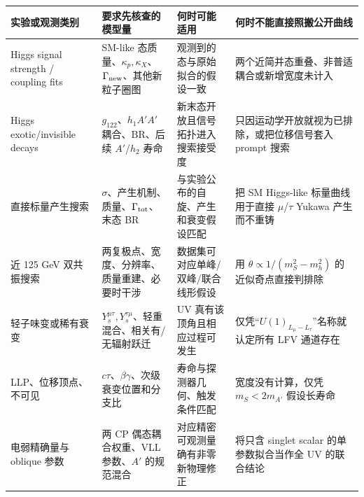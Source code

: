 \documentclass[
  chinese,
  UTF8]{ctexart}
\newcounter{none} %
\begin{document}
{\def\LTcaptype{none} %
\begin{longtable}[]{@{}
  >{\raggedright\arraybackslash}p{}
  >{\raggedright\arraybackslash}p{}
  >{\raggedright\arraybackslash}p{}
  >{\raggedright\arraybackslash}p{}@{}}
\toprule\noalign{}
\begin{minipage}[b]{\linewidth}\raggedright
实验或观测类别
\end{minipage} & \begin{minipage}[b]{\linewidth}\raggedright
要求先核查的模型量
\end{minipage} & \begin{minipage}[b]{\linewidth}\raggedright
何时可能适用
\end{minipage} & \begin{minipage}[b]{\linewidth}\raggedright
何时不能直接照搬公开曲线
\end{minipage} \\
\midrule\noalign{}
\endhead
\bottomrule\noalign{}
\endlastfoot
Higgs signal strength / coupling fits & SM-like
态质量、\(\kappa_p,\kappa_X\)、\(\Gamma_{\rm new}\)、其他新粒子圈图 &
观测到的态与原始拟合的假设一致 &
两个近简并态重叠、非普适耦合或新增宽度未计入 \\
Higgs exotic/invisible decays & \(g_{122}\)、\(h_1A'A'\)
耦合、\(\mathrm{BR}\)、后续 \(A'\)/\(h_2\) 寿命 &
新末态开放且信号拓扑进入搜索接受度 &
只因运动学开放就视为已排除，或把位移信号套入 prompt 搜索 \\
直接标量产生搜索 &
\(\sigma\)、产生机制、质量、\(\Gamma_{\rm tot}\)、末态 BR &
与实验公布的自旋、产生和衰变假设匹配 & 把 SM Higgs-like 标量曲线用于直接
\ensuremath{\mu}/\ensuremath{\tau} Yukawa 产生而不重铸 \\
近 125 GeV 双共振搜索 & 两复极点、宽度、分辨率、质量重建、必要时干涉 &
数据集可对应单峰/双峰/联合线形假设 & 用 \(\theta\propto1/(m_S^2-m_h^2)\)
的近似奇点直接判排除 \\
轻子味变或稀有衰变 &
\(Y_s^{\mu\tau},Y_s^{\tau\mu}\)、轻重混合、相关有/无辐射跃迁 & UV
真有该顶角且相应过程可发生 &
仅凭``\(U(1)_{L_\mu-L_\tau}\)''名称就认定所有 LFV 通道存在 \\
LLP、位移顶点、不可见 & \(c\tau\)、\(\beta\gamma\)、次级衰变位置和分支比
& 寿命与探测器几何、触发条件匹配 & 宽度没有计算，仅凭 \(m_S<2m_{A'}\)
假设长寿命 \\
电弱精确量与 oblique 参数 & 两 CP 偶态耦合权重、VLL 参数、\(A'\)
的规范混合 & 对应精密可观测量确有非零新物理修正 & 将只含 singlet scalar
的单参数拟合当作全 UV 的联合结论 \\
\end{longtable}
}
\end{document}
